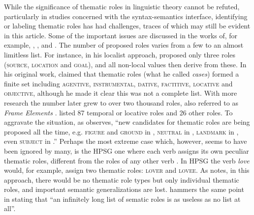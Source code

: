 \documentclass[output=paper]{langsci/langscibook}
\begin{document}
While the significance of thematic roles in linguistic theory cannot be refuted, particularly in studies concerned with the syntax-semantics interface, identifying or labeling thematic roles has had challenges, traces of which may still be evident in this article. Some of the important issues are discussed in the works of, for example, \citet{Dowty1991}, \citet{Jackendoff1987}, \citet[689]{Newmeyer2010} and \citet[6]{KittilaEtAl2011}. The number of proposed roles varies from a few to an almost limitless list. For instance, in his localist approach, \citet{Anderson1971} proposed only three roles (\textsc{source, location} and \textsc{goal}), and all non-local values then derive from these. In his original work, \citet{Fillmore1968} claimed that thematic roles (what he called \textit{cases}) formed a finite set including \textsc{agentive, instrumental, dative, factitive, locative} and \textsc{objective,} although he made it clear this was not a complete list. With more research the number later grew to over two thousand roles, also referred to as \textit{Frame Elements} \citep{Fillmore1985}. \citet{Blake1930} listed 87 temporal or locative roles and 26 other roles. To aggravate the situation, as \citet[548-549]{Dowty1991} observes, “new candidates for thematic roles are being proposed all the time, e.g. \textsc{figure} and \textsc{ground} in \citealt{Talmy1985figureground}, \textsc{neutral} in \citealt{Rozwadowska1988}, \textsc{landmark} in \citealt{Jackendoff1982}, even \textsc{subject} in \citealt{Baker1985}.” Perhaps the most extreme case which, however, seems to have been ignored by many, is the HPSG one where each verb assigns its own peculiar thematic roles, different from the roles of any other verb \citep{PollardSag1994}. In HPSG the verb \textit{love} would, for example, assign two thematic roles: \textsc{lover} and \textsc{lovee}. As \citet{Dowty1989} notes, in this approach, there would be no thematic role types but only individual thematic roles, and important semantic generalizations are lost. \citet[52]{Payne1997} hammers the same point in stating that “an infinitely long list of sematic roles is as useless as no list at all”.
\end{document}
